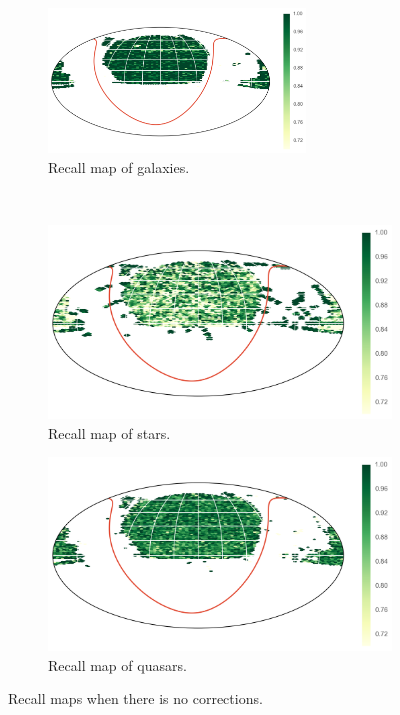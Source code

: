 \begin{figure}[p]
	\centering
	\begin{subfigure}{\textwidth}
		\centering
		\includegraphics[width=0.75\textwidth]{figures/appendix/map_recall_uncorrected_Galaxy}
		\caption{Recall map of galaxies.}
		\label{fig:map_recall_uncorrected_galaxies}
	\end{subfigure}\\
	\begin{subfigure}{\textwidth}
		\centering
		\includegraphics[width=0.75\linewidth]{figures/appendix/map_recall_uncorrected_Star}
		\caption{Recall map of stars.}
		\label{fig:map_recall_uncorrected_stars}
	\end{subfigure}
	\begin{subfigure}{\textwidth}
		\centering
		\includegraphics[width=0.75\linewidth]{figures/appendix/map_recall_uncorrected_Quasar}
		\caption{Recall map of quasars.}
		\label{fig:map_recall_uncorrected_quasars}
	\end{subfigure}
	\caption[Recall maps when there is no corrections]{
        Recall maps when there is no corrections.}
	\label{fig:map_recall_uncorrected}
\end{figure}


